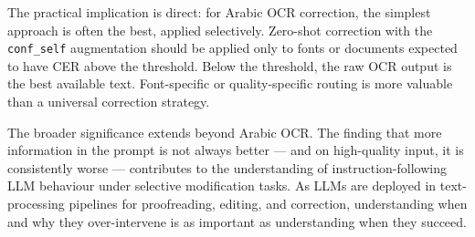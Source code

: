 The practical implication is direct: for Arabic OCR correction, the simplest
approach is often the best, applied selectively. Zero-shot correction with
the \texttt{conf\_self} augmentation should be applied only to fonts or
documents expected to have CER above the threshold. Below the threshold,
the raw OCR output is the best available text. Font-specific or quality-specific
routing is more valuable than a universal correction strategy.

The broader significance extends beyond Arabic OCR. The finding that more
information in the prompt is not always better --- and on high-quality input,
it is consistently worse --- contributes to the understanding of
instruction-following LLM behaviour under selective modification tasks. As
LLMs are deployed in text-processing pipelines for proofreading, editing,
and correction, understanding when and why they over-intervene is as important
as understanding when they succeed.
